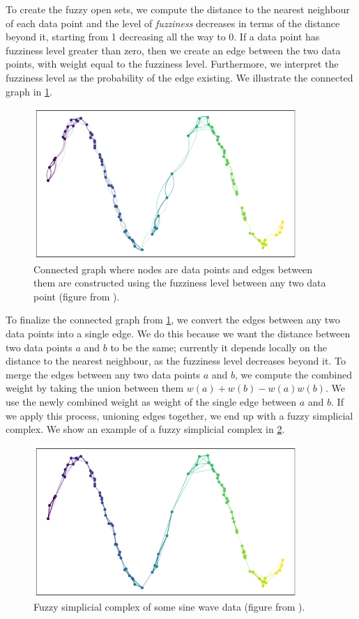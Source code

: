 To create the fuzzy open sets, we compute the distance to the nearest neighbour of each data point and the level of \textit{fuzziness} decreases in terms of the distance beyond it, starting from 1 decreasing all the way to 0. If a data point has fuzziness level greater than zero, then we create an edge between the two data points, with weight equal to the fuzziness level. Furthermore, we interpret the fuzziness level as the probability of the edge existing. We illustrate the connected graph in \cref{fig:how_umap_works_raw_graph}.

\begin{figure}[H]
    \centering
    \includegraphics[width=10cm]{thesis/figures/how_umap_works_raw_graph.png}
    \caption{Connected graph where nodes are data points and edges between them are constructed using the fuzziness level between any two data point (figure from \cite{how-umap-works-2018}).}
    \label{fig:how_umap_works_raw_graph}
\end{figure}
To finalize the connected graph from \cref{fig:how_umap_works_raw_graph}, we convert the edges between any two data points into a single edge. We do this because we want the distance between two data points $a$ and $b$ to be the same; currently it depends locally on the distance to the nearest neighbour, as the fuzziness level decreases beyond it. To merge the edges between any two data points $a$ and $b$, we compute the combined weight by taking the union between them $w(a) + w(b) - w(a)w(b)$. We use the newly combined weight as weight of the single edge between $a$ and $b$. If we apply this process, unioning edges together, we end up with a fuzzy simplicial complex. We show an example of a fuzzy simplicial complex in \cref{fig:how_umap_works_umap_graph}.
\begin{figure}[H]
    \centering
    \includegraphics[width=10cm]{thesis/figures/how_umap_works_umap_graph.png}
    \caption{Fuzzy simplicial complex of some sine wave data (figure from \cite{how-umap-works-2018}).}
    \label{fig:how_umap_works_umap_graph}
\end{figure}
